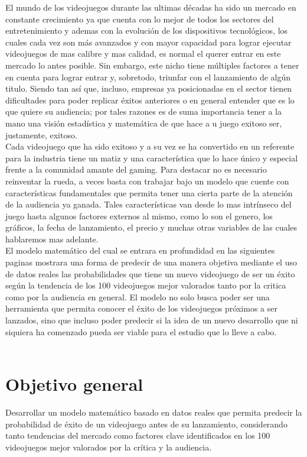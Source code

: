 \documentclass[titlepage,a4paper]{article}
\begin{document}
El mundo de los videojuegos durante las ultimas décadas ha sido un mercado en constante crecimiento ya que cuenta con lo mejor de todos los sectores del entretenimiento y ademas con la evolución de los dispositivos tecnológicos, los cuales cada vez son más avanzados y con mayor capacidad para lograr ejecutar videojuegos de mas calibre y mas calidad, es normal el querer entrar en este mercado lo antes posible. Sin embargo, este nicho tiene múltiples factores a tener en cuenta para lograr entrar y, sobretodo, triunfar con el lanzamiento de algún titulo. Siendo tan así que, incluso, empresas ya posicionadas en el sector tienen dificultades para poder replicar éxitos anteriores o en general entender que es lo que quiere su audiencia; por tales razones es de suma importancia tener a la mano una visión estadística y matemática de que hace a u  juego exitoso ser, justamente, exitoso.   \\

Cada videojuego que ha sido exitoso y a su vez se ha convertido en un referente para la industria tiene un matiz y una característica que lo hace único y especial frente a la comunidad amante del gaming. Para destacar no es necesario reinventar la rueda, a veces basta con trabajar bajo un modelo que cuente con características fundamentales que permita tener una cierta parte de la atención de la audiencia ya ganada. Tales características van desde lo mas intrínseco del juego hasta algunos factores externos al mismo, como lo son el genero, los gráficos, la fecha de lanzamiento, el precio y muchas otras variables de las cuales hablaremos mas adelante. \\

El modelo matemático del cual se entrara en profundidad en las siguientes paginas mostrara una forma de predecir de una manera objetiva mediante el uso de datos reales las probabilidades que tiene un nuevo videojuego de ser un éxito según la tendencia de los 100 videojuegos mejor valorados tanto por la critica como por la audiencia en general. El modelo no solo busca poder ser una herramienta que permita conocer el éxito de los videojuegos próximos a ser lanzados, sino que incluso poder predecir si la idea de un nuevo desarrollo que ni siquiera ha comenzado pueda ser viable para el estudio que lo lleve a cabo. \\ \\

\section{Objetivo general}
Desarrollar un modelo matemático basado en datos reales que permita predecir la probabilidad de éxito de un videojuego antes de su lanzamiento, considerando tanto tendencias del mercado como factores clave identificados en los 100 videojuegos mejor valorados por la crítica y la audiencia.\\
\end{document}
